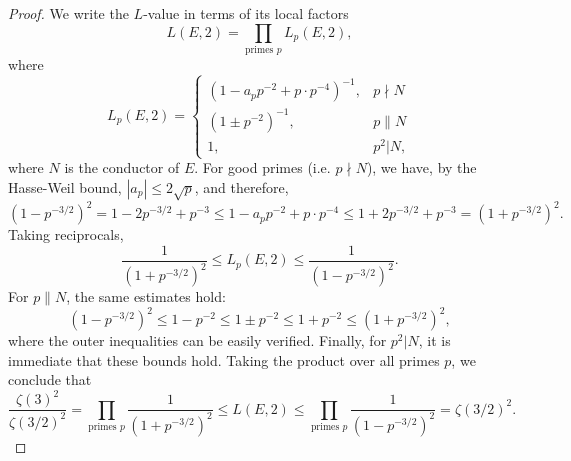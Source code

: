 \documentclass[10pt,a4paper]{amsart}
\begin{document}
\begin{proof}
We write the $L$-value in terms of its local factors
\[
L(E, 2) = \prod_{\text{primes }p} L_p(E,2),
\]
where
\[
L_p(E,2) = \begin{cases}(1-a_pp^{-2}+p\cdot p^{-4})^{-1},&p\nmid N\\ (1\pm p^{-2})^{-1}
,&p\|N\\ 1,& p^2|N,\end{cases}
\]
where $N$ is the conductor of $E$.
For good primes (i.e. $p \nmid N$), we have, by the Hasse-Weil bound, $|a_p| \leq 2 \sqrt{p}$, and therefore,
\[
(1 - p^{-3/2})^2 = 1 - 2p^{-3/2} + p^{-3} \leq 1-a_pp^{-2}+p\cdot p^{-4} \leq 1 + 2p^{-3/2} + p^{-3} = (1 + p^{-3/2})^2.
\]
Taking reciprocals,
\[
\frac{1}{(1 + p^{-3/2})^2} \leq L_p(E,2) \leq \frac{1}{(1 - p^{-3/2})^2}.
\]
For $p \| N$, the same estimates hold:
\[
(1-p^{-3/2})^2 \leq 1 - p^{-2} \leq 1 \pm p^{-2} \leq 1 + p^{-2} \leq (1 + p^{-3/2})^2,
\]
where the outer inequalities can be easily verified. Finally, for $p^2 | N$, it is immediate that these bounds hold. Taking the product over all primes $p$, we conclude that
\[
\frac{\zeta(3)^2}{\zeta(3/2)^2} = \prod_{\text{primes }p} \frac{1}{(1 + p^{-3/2})^2} \leq L(E,2) \leq \prod_{\text{primes }p} \frac{1}{(1 - p^{-3/2})^2} = \zeta(3/2)^2.
\]
\end{proof}
\end{document}
